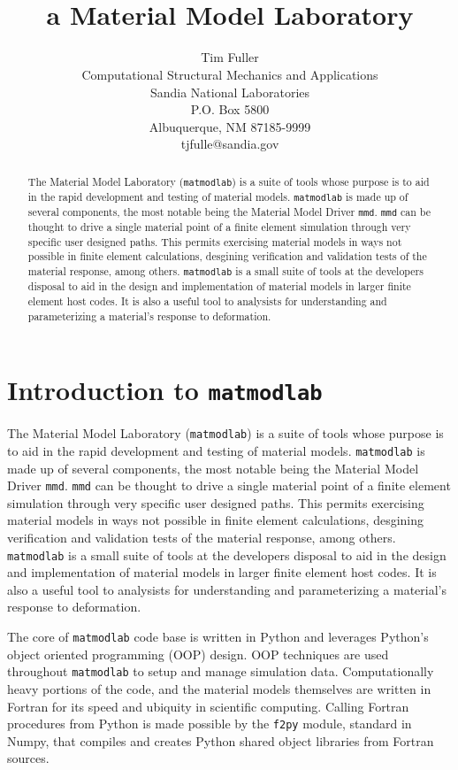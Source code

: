 \documentclass[12pt,report,strict]{SANDreport/SANDreport}
\title{\mml{} \\ a Material Model Laboratory}
\author{Tim Fuller \\
  Computational Structural Mechanics and Applications \\
  Sandia National Laboratories\\
  P.O. Box 5800\\
  Albuquerque, NM 87185-9999 \\
  tjfulle@sandia.gov }
\date{}
\newcommand{\mml}{\texttt{matmodlab}}
\newcommand{\mmd}{\texttt{mmd}}
\newcommand{\fpy}[1]{\texttt{f2py}}
\begin{document}
\maketitle

\begin{abstract}
  The Material Model Laboratory (\mml{}) is a suite of tools whose purpose is
  to aid in the rapid development and testing of material models. \mml{} is
  made up of several components, the most notable being the Material Model
  Driver \mmd{}. \mmd{} can be thought to drive a single material point of a
  finite element simulation through very specific user designed paths. This
  permits exercising material models in ways not possible in finite element
  calculations, desgining verification and validation tests of the material
  response, among others. \mml{} is a small suite of tools at the developers
  disposal to aid in the design and implementation of material models in
  larger finite element host codes. It is also a useful tool to analysists for
  understanding and parameterizing a material's response to deformation.
\end{abstract}

\cleardoublepage		%
\tableofcontents
\listoffigures
\listoftables

\SANDmain		%

\chapter{Introduction to \mml{}}
\label{chap:intro}
The Material Model Laboratory (\mml{}) is a suite of tools whose purpose is to
aid in the rapid development and testing of material models. \mml{} is made up
of several components, the most notable being the Material Model Driver
\mmd{}. \mmd{} can be thought to drive a single material point of a finite
element simulation through very specific user designed paths. This permits
exercising material models in ways not possible in finite element
calculations, desgining verification and validation tests of the material
response, among others. \mml{} is a small suite of tools at the developers
disposal to aid in the design and implementation of material models in larger
finite element host codes. It is also a useful tool to analysists for
understanding and parameterizing a material's response to deformation.

The core of \mml{} code base is written in Python and leverages Python's
object oriented programming (OOP) design. OOP techniques are used throughout
\mml{} to setup and manage simulation data. Computationally heavy portions of
the code, and the material models themselves are written in Fortran for its
speed and ubiquity in scientific computing. Calling Fortran procedures from
Python is made possible by the \fpy{} module, standard in Numpy, that compiles
and creates Python shared object libraries from Fortran sources.
\end{document}
